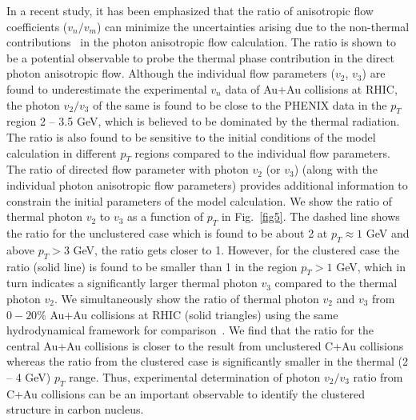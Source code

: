 \documentclass[aps,prc,twocolumn,floatfix,12pts,superscriptaddress]{revtex4}
\begin{document}
In a recent study, it has been emphasized that the ratio of anisotropic flow coefficients ($ v_n/v_m$) can minimize the uncertainties arising due to the non-thermal  contributions~\cite{Chatterjee:2021bhz} in the photon anisotropic flow calculation. The ratio is shown to be a potential observable to probe the thermal phase contribution in the direct photon anisotropic flow. Although the individual flow parameters ($v_2$, $v_3$) are found to underestimate the experimental $v_n$ data { of Au+Au collisions} at RHIC, the photon $v_2/v_3$   {of the same} is found to be close to the PHENIX data in the $p_T$ region 2 -- 3.5 GeV, which is believed to be dominated by the thermal radiation. The ratio is also found to be sensitive to the initial conditions of the model calculation in different $p_T$ regions compared to the individual flow parameters. The ratio of directed flow parameter with photon $v_2$ (or $v_3$) (along with the individual photon anisotropic flow parameters) provides additional information to constrain the initial parameters of the model calculation. We show the ratio of thermal photon $ v_2$ to $ v_3$ as a function of $p_T$ in Fig.~\ref{fig5}. The dashed line shows the ratio for the unclustered case which is found to be about 2 at $p_T \approx 1$ GeV and above $p_T>3$ GeV, the ratio gets closer to 1. However, for the clustered case the ratio (solid line) is found to be smaller than 1 in the region $ p_T > 1$ GeV, which in turn indicates a significantly larger thermal photon $ v_3$  compared to the thermal photon $ v_2$. {We simultaneously show the ratio of thermal  photon $v_2$ and $v_3$ from $0-20\%$ Au+Au collisions at RHIC  (solid triangles) using the same hydrodynamical framework for comparison{~\cite{Chatterjee:2021bhz}}. We find that the ratio for the central Au+Au collisions is closer to the result from unclustered C+Au collisions whereas the ratio from the clustered case is significantly smaller in the thermal (2 -- 4 GeV) $p_T$ range. Thus, experimental determination of photon $v_2/v_3$ ratio from C+Au collisions can be an important observable to identify the clustered structure in carbon nucleus.  \\


}
\end{document}
